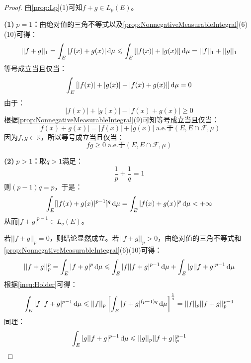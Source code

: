 \begin{proof}
	由\cref{prop:Lp}(1)可知$f+g\in L_p(E)$。\par
	\textbf{(1)$\;p=1$：}由绝对值的三角不等式以及\cref{prop:NonnegativeMeasurableIntegral}(6)(10)可得：
	\begin{equation*}
		||f+g||_1=\int_{E}|f(x)+g(x)|\mathop{}\!\mathrm{d}\mu\leqslant\int_{E}\left[|f(x)|+|g(x)|\right]\mathop{}\!\mathrm{d}\mu=||f||_1+||g||_1
	\end{equation*}
	等号成立当且仅当：
	\begin{equation*}
		\int_{E}\left[|f(x)|+|g(x)|-|f(x)+g(x)|\right]\mathop{}\!\mathrm{d}\mu=0
	\end{equation*}
	由于：
	\begin{equation*}
		|f(x)|+|g(x)|-|f(x)+g(x)|\geqslant0
	\end{equation*}
	根据\cref{prop:NonnegativeMeasurableIntegral}(9)可知等号成立当且仅当：
	\begin{equation*}
		|f(x)+g(x)|=|f(x)|+|g(x)|\;\text{a.e.于$(E,E\cap\mathscr{F},\mu)$}
	\end{equation*}
	因为$f,g\in\mathbb{R}$，所以等号成立当且仅当：
	\begin{equation*}
		fg\geqslant0\;\text{a.e.于$(E,E\cap\mathscr{F},\mu)$}
	\end{equation*}\par
	\textbf{(2)$\;p>1$：}取$q>1$满足：
	\begin{equation*}
		\frac{1}{p}+\frac{1}{q}=1
	\end{equation*}
	则$(p-1)q=p$，于是：
	\begin{equation*}
		\int_{E}[|f(x)+g(x)|^{p-1}]^q\mathop{}\!\mathrm{d}\mu=\int_{E}|f(x)+g(x)|^p\mathop{}\!\mathrm{d}\mu<+\infty
	\end{equation*}
	从而$|f+g|^{p-1}\in L_q(E)$。\par
	若$||f+g||_p=0$，则结论显然成立。若$||f+g||_p>0$，由绝对值的三角不等式和\cref{prop:NonnegativeMeasurableIntegral}(6)(10)可得：
	\begin{equation*}
		||f+g||_p^p=\int_{E}|f+g|^p\mathop{}\!\mathrm{d}\mu\leqslant\int_{E}|f||f+g|^{p-1}\mathop{}\!\mathrm{d}\mu+\int_{E}|g||f+g|^{p-1}\mathop{}\!\mathrm{d}\mu
	\end{equation*}
	根据\cref{ineq:Holder}可得：
	\begin{equation*}
		\int_{E}|f||f+g|^{p-1}\mathop{}\!\mathrm{d}\mu\leqslant||f||_p\left[\int_{E}|f+g|^{(p-1)q}\mathop{}\!\mathrm{d}\mu\right]^\frac{1}{q}=||f||_p||f+g||_p^{p-1}
	\end{equation*}
	同理：
	\begin{equation*}
		\int_{E}|g||f+g|^{p-1}\mathop{}\!\mathrm{d}\mu\leqslant||g||_p||f+g||_p^{p-1}
	\end{equation*}

\end{proof}
